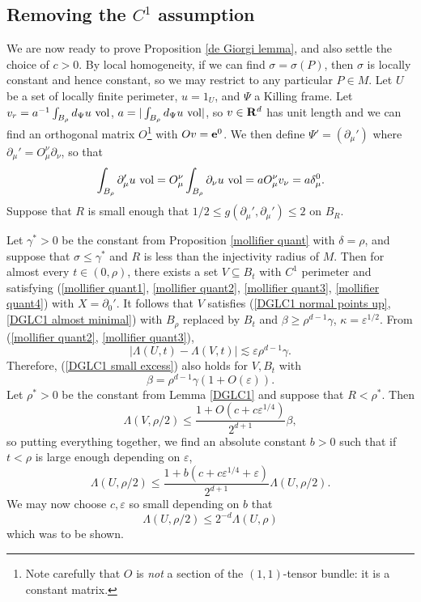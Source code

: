 \subsection{Removing the \texorpdfstring{$C^1$}{C1} assumption}\label{proof of DGL}
We are now ready to prove Proposition \ref{de Giorgi lemma}, and also settle the choice of $c > 0$.
By local homogeneity, if we can find $\sigma = \sigma(P)$, then $\sigma$ is locally constant and hence constant, so we may restrict to any particular $P \in M$.
Let $U$ be a set of locally finite perimeter, $u = 1_U$, and $\Psi$ a Killing frame.
Let $v_r = a^{-1}\int_{B_\rho} d_\Psi u ~\mathrm{vol}$, $a = |\int_{B_\rho} d_\Psi u ~\mathrm{vol}|$, so $v \in \mathbf{R}^d$ has unit length and we can find an orthogonal matrix $O$\footnote{Note carefully that $O$ is \emph{not} a section of the $(1,1)$-tensor bundle: it is a constant matrix.} with $Ov = \mathbf e^0$.
We then define $\Psi' = (\partial_\mu')$ where $\partial_\mu' = O^\nu_\mu \partial_\nu$, so that 
$$\int_{B_\rho} \partial_\mu'u~\mathrm{vol} = O^\nu_\mu \int_{B_\rho} \partial_\nu u ~\mathrm{vol} = aO^\nu_\mu v_\nu = a\delta_\mu^0.$$
Suppose that $R$ is small enough that $1/2 \leq g(\partial_\mu', \partial_\mu') \leq 2$ on $B_R$.

Let $\gamma^* > 0$ be the constant from Proposition \ref{mollifier quant} with $\delta = \rho$, and suppose that $\sigma \leq \gamma^*$ and $R$ is less than the injectivity radius of $M$.
Then for almost every $t \in (0, \rho)$, there exists a set $V \subseteq B_t$ with $C^1$ perimeter and satisfying (\ref{mollifier quant1}, \ref{mollifier quant2}, \ref{mollifier quant3}, \ref{mollifier quant4}) with $X = \partial_0'$.
It follows that $V$ satisfies (\ref{DGLC1 normal points up}, \ref{DGLC1 almost minimal}) with $B_\rho$ replaced by $B_t$ and $\beta \geq \rho^{d - 1} \gamma$, $\kappa = \varepsilon^{1/2}$.
From (\ref{mollifier quant2}, \ref{mollifier quant3}),
$$|\Lambda(U, t) - \Lambda(V, t)| \lesssim \varepsilon \rho^{d - 1} \gamma.$$
Therefore, (\ref{DGLC1 small excess}) also holds for $V, B_t$ with
$$\beta = \rho^{d - 1} \gamma(1 + O(\varepsilon)).$$
Let $\rho^* > 0$ be the constant from Lemma \ref{DGLC1} and suppose that $R < \rho^*$.
Then
$$\Lambda(V, \rho/2) \leq \frac{1 + O(c + c\varepsilon^{1/4})}{2^{d + 1}} \beta,$$
so putting everything together, we find an absolute constant $b > 0$ such that if $t < \rho$ is large enough depending on $\varepsilon$,
$$\Lambda(U, \rho/2) \leq \frac{1 + b(c + c\varepsilon^{1/4} + \varepsilon)}{2^{d + 1}} \Lambda(U, \rho/2).$$
We may now choose $c, \varepsilon$ so small depending on $b$ that 
$$\Lambda(U, \rho/2) \leq 2^{-d} \Lambda(U, \rho)$$
which was to be shown.